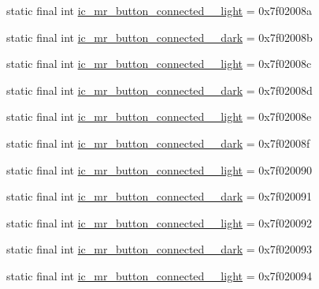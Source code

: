\begin{CompactItemize}
\item 
static final int \hyperlink{classandroid_1_1support_1_1graphics_1_1drawable_1_1animated_1_1_r_1_1drawable_5de69ca09a4d3f5fe484afd3ea404caf}{ic\_\-mr\_\-button\_\-connected\_\_\-light} = 0x7f02008a
\item 
static final int \hyperlink{classandroid_1_1support_1_1graphics_1_1drawable_1_1animated_1_1_r_1_1drawable_cfd74d80dac484f6784c8a153c7fc1de}{ic\_\-mr\_\-button\_\-connected\_\_\-dark} = 0x7f02008b
\item 
static final int \hyperlink{classandroid_1_1support_1_1graphics_1_1drawable_1_1animated_1_1_r_1_1drawable_6b23754c39ad2510cc5d3366dc27e773}{ic\_\-mr\_\-button\_\-connected\_\_\-light} = 0x7f02008c
\item 
static final int \hyperlink{classandroid_1_1support_1_1graphics_1_1drawable_1_1animated_1_1_r_1_1drawable_b1a80909f204947517e2632de68f6b2b}{ic\_\-mr\_\-button\_\-connected\_\_\-dark} = 0x7f02008d
\item 
static final int \hyperlink{classandroid_1_1support_1_1graphics_1_1drawable_1_1animated_1_1_r_1_1drawable_03b8ff94b1659bc05e30c8703d980d02}{ic\_\-mr\_\-button\_\-connected\_\_\-light} = 0x7f02008e
\item 
static final int \hyperlink{classandroid_1_1support_1_1graphics_1_1drawable_1_1animated_1_1_r_1_1drawable_95ea6252863d32facab8893c76ba1809}{ic\_\-mr\_\-button\_\-connected\_\_\-dark} = 0x7f02008f
\item 
static final int \hyperlink{classandroid_1_1support_1_1graphics_1_1drawable_1_1animated_1_1_r_1_1drawable_43adac1a9ffccb79f7758fe91d45cbee}{ic\_\-mr\_\-button\_\-connected\_\_\-light} = 0x7f020090
\item 
static final int \hyperlink{classandroid_1_1support_1_1graphics_1_1drawable_1_1animated_1_1_r_1_1drawable_b2e01aaf6131590236e200406a66607e}{ic\_\-mr\_\-button\_\-connected\_\_\-dark} = 0x7f020091
\item 
static final int \hyperlink{classandroid_1_1support_1_1graphics_1_1drawable_1_1animated_1_1_r_1_1drawable_e99252db0a7439380e74051a0a5fb234}{ic\_\-mr\_\-button\_\-connected\_\_\-light} = 0x7f020092
\item 
static final int \hyperlink{classandroid_1_1support_1_1graphics_1_1drawable_1_1animated_1_1_r_1_1drawable_d4da4c2a298f315f926e1da9fa1f8e29}{ic\_\-mr\_\-button\_\-connected\_\_\-dark} = 0x7f020093
\item 
static final int \hyperlink{classandroid_1_1support_1_1graphics_1_1drawable_1_1animated_1_1_r_1_1drawable_5b04b3c8624d7705badc244f166ebe9f}{ic\_\-mr\_\-button\_\-connected\_\_\-light} = 0x7f020094

\end{CompactItemize}

